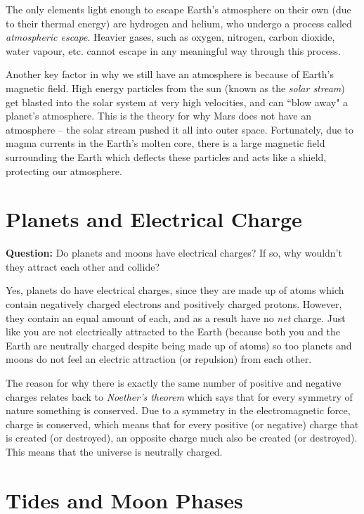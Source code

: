\documentclass[addpoints,12pt]{exam}
\begin{document}
The only elements light enough to escape Earth's atmosphere on their own (due to their thermal energy) are hydrogen and helium, who undergo a process called \textit{atmospheric escape}. Heavier gases, such as oxygen, nitrogen, carbon dioxide, water vapour, etc. cannot escape in any meaningful way through this process.

Another key factor in why we still have an atmosphere is because of Earth's magnetic field. High energy particles from the sun (known as the \textit{solar stream}) get blasted into the solar system at very high velocities, and can ``blow away" a planet's atmosphere. This is the theory for why Mars does not have an atmosphere -- the solar stream pushed it all into outer space. Fortunately, due to magma currents in the Earth's molten core, there is a large magnetic field surrounding the Earth which deflects these particles and acts like a shield, protecting our atmosphere.

\section{Planets and Electrical Charge}
\noindent\textbf{Question:} Do planets and moons have electrical charges? If so, why wouldn't they attract each other and collide?

Yes, planets do have electrical charges, since they are made up of atoms which contain negatively charged electrons and positively charged protons. However, they contain an equal amount of each, and as a result have no \textit{net} charge. Just like you are not electrically attracted to the Earth (because both you and the Earth are neutrally charged despite being made up of atoms) so too planets and moons do not feel an electric attraction (or repulsion) from each other.

The reason for why there is exactly the same number of positive and negative charges relates back to \textit{Noether's theorem} which says that for every symmetry of nature something is conserved. Due to a symmetry in the electromagnetic force, charge is conserved, which means that for every positive (or negative) charge that is created (or destroyed), an opposite charge much also be created (or destroyed). This means that the universe is neutrally charged.

\section{Tides and Moon Phases}
\end{document}
